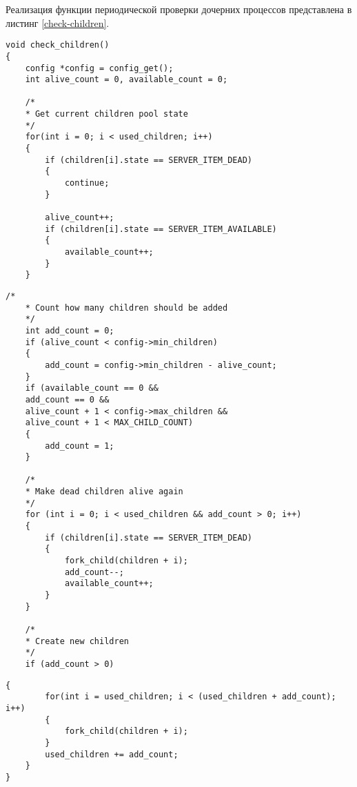 Реализация функции периодической проверки дочерних процессов представлена в листинг \ref{check-children}.

\begin{lstlisting}[caption={Реализация функции check\_children()}, label=check-children]
void check_children()
{
	config *config = config_get();
	int alive_count = 0, available_count = 0;
	
	/*
	* Get current children pool state
	*/
	for(int i = 0; i < used_children; i++)
	{
		if (children[i].state == SERVER_ITEM_DEAD)
		{
			continue;
		}
		
		alive_count++;
		if (children[i].state == SERVER_ITEM_AVAILABLE)
		{
			available_count++;
		}
	}
\end{lstlisting}

\begin{lstlisting}[title={Продолжение листинга \ref{check-children}}, label=check-children1, firstnumber=22]
	/*
	* Count how many children should be added
	*/
	int add_count = 0;
	if (alive_count < config->min_children)
	{
		add_count = config->min_children - alive_count;
	}
	if (available_count == 0 && 
	add_count == 0 && 
	alive_count + 1 < config->max_children && 
	alive_count + 1 < MAX_CHILD_COUNT)
	{
		add_count = 1;
	}
	
	/*
	* Make dead children alive again
	*/
	for (int i = 0; i < used_children && add_count > 0; i++)
	{
		if (children[i].state == SERVER_ITEM_DEAD)
		{
			fork_child(children + i);
			add_count--;
			available_count++;
		}
	}
	
	/*
	* Create new children
	*/
	if (add_count > 0)
\end{lstlisting}

\begin{lstlisting}[title={Окончание листинга \ref{check-children}}, label=check-children2, firstnumber=55]
	{
		for(int i = used_children; i < (used_children + add_count); i++)
		{
			fork_child(children + i);
		}
		used_children += add_count;
	}
}
\end{lstlisting}

\pagebreak